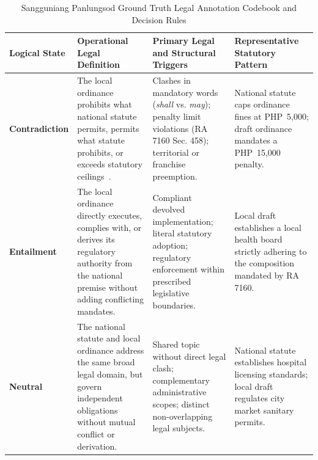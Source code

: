     \begin{table}[htbp]
        \centering
        \small
        \setlength{\tabcolsep}{5pt}
        \caption[Legal Annotation Codebook and Ground Truth Decision Rules]{Sangguniang Panlungsod Ground Truth Legal Annotation Codebook and Decision Rules}
        \label{tab:annotation_codebook}
        \begin{tabularx}{\linewidth}{>{\RaggedRight\arraybackslash}p{2.6cm}>{\RaggedRight\arraybackslash}p{3.9cm}>{\RaggedRight\arraybackslash}X>{\RaggedRight\arraybackslash}p{3.9cm}}
            \toprule
            \textbf{Logical State} & \textbf{Operational Legal Definition} & \textbf{Primary Legal and Structural Triggers} & \textbf{Representative Statutory Pattern} \\
            \midrule
            \textbf{Contradiction} & The local ordinance prohibits what national statute permits, permits what statute prohibits, or exceeds statutory ceilings~\cite{scp1994magtajasvpryce}. & Clashes in mandatory words (\textit{shall} vs. \textit{may}); penalty limit violations (RA 7160 Sec. 458); territorial or franchise preemption. & National statute caps ordinance fines at PHP~5,000; draft ordinance mandates a PHP~15,000 penalty. \\
            \addlinespace[3pt]
            \textbf{Entailment} & The local ordinance directly executes, complies with, or derives its regulatory authority from the national premise without adding conflicting mandates. & Compliant devolved implementation; literal statutory adoption; regulatory enforcement within prescribed legislative boundaries. & Local draft establishes a local health board strictly adhering to the composition mandated by RA 7160. \\
            \addlinespace[3pt]
            \textbf{Neutral} & The national statute and local ordinance address the same broad legal domain, but govern independent obligations without mutual conflict or derivation. & Shared topic without direct legal clash; complementary administrative scopes; distinct non-overlapping legal subjects. & National statute establishes hospital licensing standards; local draft regulates city market sanitary permits. \\
            \bottomrule
        \end{tabularx}
    \end{table}

